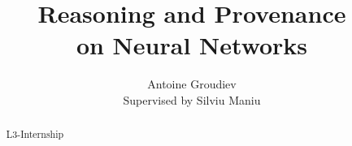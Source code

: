 \documentclass[toc]{../cs-classes/cs-classes}
\title{Reasoning and Provenance\\ on Neural Networks}
\author{Antoine Groudiev\\Supervised by Silviu Maniu}
\begin{document}
\begin{abstract}
    L3-Internship
\end{abstract}
\end{document}
